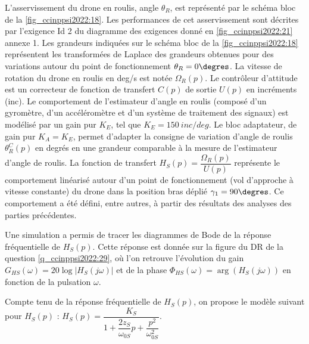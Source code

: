 L’asservissement du drone en roulis, angle $\theta_R$, est représenté par le schéma bloc de la
\autoref{fig_ccinppsi2022:18}. Les performances de cet asservissement sont décrites par l’exigence Id 2 du
diagramme des exigences donné en \autoref{fig_ccinppsi2022:21} annexe 1. Les grandeurs indiquées sur le
schéma bloc de la \autoref{fig_ccinppsi2022:18} représentent les transformées de Laplace des grandeurs obtenues pour des variations autour du point de fonctionnement $\theta_R = 0\degres$. La vitesse de rotation du
drone en roulis en \si{deg/s} est notée $\Omega_R(p)$. Le contrôleur d’attitude est un correcteur de fonction de transfert $C(p)$ de sortie $U(p)$ en incréments (inc). Le comportement de l’estimateur
d’angle en roulis (composé d’un gyromètre, d’un accéléromètre et d’un système de traitement des signaux) est modélisé par un gain pur $K_E$, tel que $K_E = \SI{150}{inc/deg}$.
Le bloc adaptateur, de gain pur $K_A = K_E$, permet d’adapter la consigne de variation d’angle
de roulis $\theta_R^C(p)$ en degrés en une grandeur comparable à la mesure de l’estimateur d’angle
de roulis.
La fonction de transfert $H_S (p) = \dfrac{\Omega_R(p)}{U(p)}$ représente le comportement linéarisé autour d’un
point de fonctionnement (vol d’approche à vitesse constante) du drone dans la position bras
déplié $\gamma_1 = 90\degres$. Ce comportement a été défini, entre autres, à partir des résultats des analyses des parties précédentes.


Une simulation a permis de tracer les diagrammes de Bode de la réponse fréquentielle de
$H_S (p)$. Cette réponse est donnée sur la figure du DR de la question \ref{q_ccinppsi2022:29}, où l’on retrouve l’évolution du
gain $G_{HS}(\omega) = 20 \log |H_S (j\omega)|$ et de la phase $\Phi_{HS} (\omega) = \arg\left(H_S (j\omega)\right)$ en fonction de la pulsation $\omega$.

Compte tenu de la réponse fréquentielle de $H_S (p)$, on propose le modèle suivant pour $H_S (p)$ :
$H_S(p)=\dfrac{K_S}{1+\dfrac{2z_S}{\omega_{0S}}p+\dfrac{p^2}{\omega_{0S}^2}}$.


